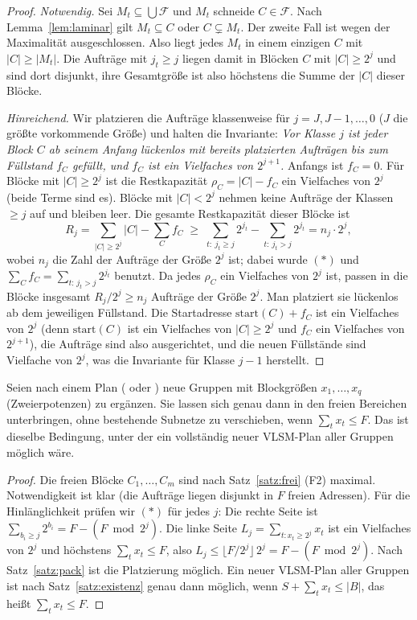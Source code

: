 \begin{proof}
	\emph{Notwendig.} Sei $M_t \subseteq \bigcup\mathcal{F}$ und $M_t$ schneide $C \in \mathcal{F}$. Nach Lemma~\ref{lem:laminar} gilt $M_t \subseteq C$ oder $C \subsetneq M_t$. Der zweite Fall ist wegen der Maximalität ausgeschlossen. Also liegt jedes $M_t$ in einem einzigen $C$ mit $|C| \ge |M_t|$. Die Aufträge mit $j_t\ge j$ liegen damit in Blöcken $C$ mit $|C|\ge 2^j$ und sind dort disjunkt, ihre Gesamtgröße ist also höchstens die Summe der $|C|$ dieser Blöcke.

	\emph{Hinreichend.} Wir platzieren die Aufträge klassenweise für $j = J, J-1,\ldots,0$ ($J$ die größte vorkommende Größe) und halten die Invariante: \emph{Vor Klasse $j$ ist jeder Block $C$ ab seinem Anfang lückenlos mit bereits platzierten Aufträgen bis zum Füllstand $f_C$ gefüllt, und $f_C$ ist ein Vielfaches von $2^{j+1}$.} Anfangs ist $f_C = 0$. Für Blöcke mit $|C| \ge 2^j$ ist die Restkapazität $\rho_C = |C| - f_C$ ein Vielfaches von $2^j$ (beide Terme sind es). Blöcke mit $|C| < 2^j$ nehmen keine Aufträge der Klassen $\ge j$ auf und bleiben leer. Die gesamte Restkapazität dieser Blöcke ist
	\[
	R_j = \sum_{|C|\ge 2^j}|C| - \sum_C f_C \;\ge\; \sum_{t:\ j_t\ge j}2^{j_t} - \sum_{t:\ j_t > j}2^{j_t} = n_j\cdot 2^j,
	\]
	wobei $n_j$ die Zahl der Aufträge der Größe $2^j$ ist; dabei wurde $(\ast)$ und $\sum_C f_C = \sum_{t:\,j_t>j}2^{j_t}$ benutzt. Da jedes $\rho_C$ ein Vielfaches von $2^j$ ist, passen in die Blöcke insgesamt $R_j/2^j \ge n_j$ Aufträge der Größe $2^j$. Man platziert sie lückenlos ab dem jeweiligen Füllstand. Die Startadresse $\mathrm{start}(C) + f_C$ ist ein Vielfaches von $2^j$ (denn $\mathrm{start}(C)$ ist ein Vielfaches von $|C| \ge 2^j$ und $f_C$ ein Vielfaches von $2^{j+1}$), die Aufträge sind also ausgerichtet, und die neuen Füllstände sind Vielfache von $2^j$, was die Invariante für Klasse $j-1$ herstellt.
\end{proof}

\begin{korollar}
\label{kor:erweiterung}
	Seien nach einem Plan ( oder ) neue Gruppen mit Blockgrößen $x_1,\ldots,x_q$ (Zweierpotenzen) zu ergänzen. Sie lassen sich genau dann in den freien Bereichen unterbringen, ohne bestehende Subnetze zu verschieben, wenn $\sum_t x_t \le F$. Das ist dieselbe Bedingung, unter der ein vollständig neuer VLSM-Plan aller Gruppen möglich wäre.
\end{korollar}

\begin{proof}
	Die freien Blöcke $C_1,\ldots,C_m$ sind nach Satz~\ref{satz:frei} (F2) maximal. Notwendigkeit ist klar (die Aufträge liegen disjunkt in $F$ freien Adressen). Für die Hinlänglichkeit prüfen wir $(\ast)$ für jedes $j$: Die rechte Seite ist $\sum_{b_i \ge j}2^{b_i} = F - (F \bmod 2^j)$. Die linke Seite $L_j = \sum_{t: x_t\ge 2^j} x_t$ ist ein Vielfaches von $2^j$ und höchstens $\sum_t x_t \le F$, also $L_j \le \lfloor F/2^j\rfloor\, 2^j = F - (F\bmod 2^j)$. Nach Satz~\ref{satz:pack} ist die Platzierung möglich. Ein neuer VLSM-Plan aller Gruppen ist nach Satz~\ref{satz:existenz} genau dann möglich, wenn $S + \sum_t x_t \le |B|$, das heißt $\sum_t x_t \le F$.
\end{proof}

